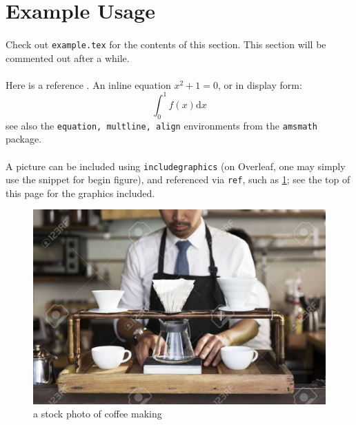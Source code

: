\newpage
\section{Example Usage}
\paragraph{}Check out \texttt{example.tex} for the contents of this section. This section will be commented out after a while.
\paragraph{}Here is a reference \cite{example2024}. An inline equation $x^2+1=0$, or in display form:
\[\int_0^1 f(x)\mathrm{d}x\]
see also the \texttt{equation, multline, align} environments from the \texttt{amsmath} package.
\paragraph{}A picture can be included using \texttt{includegraphics} (on Overleaf, one may simply use the snippet for begin figure), and referenced via \texttt{ref}, such as \ref{fig:example}; see the top of this page for the graphics included.
\begin{center}
\begin{figure}
    \centering
    \includegraphics[scale=1]{media/coffee.jpg}
    \caption{a stock photo of coffee making}
    \label{fig:example}
\end{figure}
\end{center}
